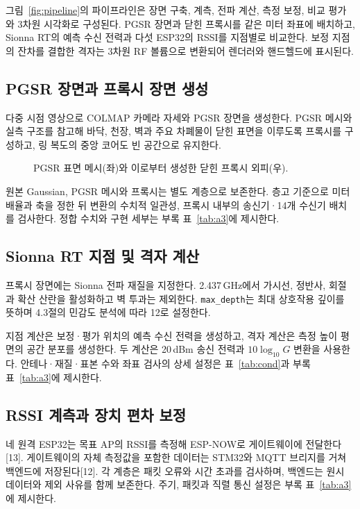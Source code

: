 \documentclass[11pt,a4paper]{article}
\newcommand{\figplaceholder}[2][0.86\textwidth]{%
  \fbox{\begin{minipage}[c][#2][c]{#1}\centering\small\color{gray}
  [그림 삽입 예정]\end{minipage}}}
\newcommand{\md}{\texttt{max\_depth}}
\begin{document}
그림~\ref{fig:pipeline}의 파이프라인은 장면 구축, 계측, 전파 계산, 측정 보정, 비교 평가와 3차원
시각화로 구성된다. PGSR 장면과 닫힌 프록시를 같은 미터 좌표에 배치하고, Sionna RT의 예측 수신 전력과
다섯 ESP32의 RSSI를 지점별로 비교한다. 보정 지점의 잔차를 결합한 격자는 3차원 RF 볼륨으로 변환되어
렌더러와 핸드헬드에 표시된다.

\subsection{PGSR 장면과 프록시 장면 생성}

다중 시점 영상으로 COLMAP 카메라 자세와 PGSR 장면을 생성한다. PGSR 메시와 실측 구조를 참고해 바닥,
천장, 벽과 주요 차폐물이 닫힌 표면을 이루도록 프록시를 구성하고, 링 복도의 중앙 코어도 빈 공간으로
유지한다.

\begin{figure}[htbp]
  \centering
  \figplaceholder{4.2cm}
  \caption{PGSR 표면 메시(좌)와 이로부터 생성한 닫힌 프록시 외피(우).}
  \label{fig:proxy}
\end{figure}

원본 Gaussian, PGSR 메시와 프록시는 별도 계층으로 보존한다. 층고 기준으로 미터 배율과 축을 정한 뒤
변환의 수치적 일관성, 프록시 내부의 송신기·14개 수신기 배치를 검사한다. 정합 수치와 구현 세부는 부록
표~\ref{tab:a3}에 제시한다.

\subsection{Sionna RT 지점 및 격자 계산}

프록시 장면에는 Sionna 전파 재질을 지정한다. 2.437\,GHz에서 가시선, 정반사, 회절과 확산 산란을
활성화하고 벽 투과는 제외한다. \md 는 최대 상호작용 깊이를 뜻하며 4.3절의 민감도 분석에 따라 12로
설정한다.

지점 계산은 보정·평가 위치의 예측 수신 전력을 생성하고, 격자 계산은 측정 높이 평면의 공간 분포를
생성한다. 두 계산은 20\,dBm 송신 전력과 $10\log_{10}G$ 변환을 사용한다. 안테나·재질·표본 수와 좌표
검사의 상세 설정은 표~\ref{tab:cond}과 부록 표~\ref{tab:a3}에 제시한다.

\subsection{RSSI 계측과 장치 편차 보정}

네 원격 ESP32는 목표 AP의 RSSI를 측정해 ESP-NOW로 게이트웨이에 전달한다[13]. 게이트웨이의 자체
측정값을 포함한 데이터는 STM32와 MQTT 브리지를 거쳐 백엔드에 저장된다[12]. 각 계층은 패킷 오류와 시간
초과를 검사하며, 백엔드는 원시 데이터와 제외 사유를 함께 보존한다. 주기, 패킷과 직렬 통신 설정은 부록
표~\ref{tab:a3}에 제시한다.
\end{document}
